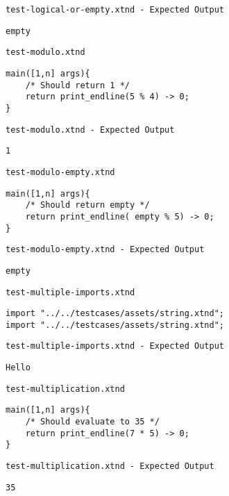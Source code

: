 \medskip \noindent \texttt{test-logical-or-empty.xtnd - Expected Output}


\begin{lstlisting}
empty
\end{lstlisting}


\medskip \noindent \texttt{test-modulo.xtnd}


\begin{lstlisting}
main([1,n] args){
	/* Should return 1 */
	return print_endline(5 % 4) -> 0;
}
\end{lstlisting}


\medskip \noindent \texttt{test-modulo.xtnd - Expected Output}


\begin{lstlisting}
1
\end{lstlisting}


\medskip \noindent \texttt{test-modulo-empty.xtnd}


\begin{lstlisting}
main([1,n] args){
	/* Should return empty */
	return print_endline( empty % 5) -> 0;
}
\end{lstlisting}


\medskip \noindent \texttt{test-modulo-empty.xtnd - Expected Output}


\begin{lstlisting}
empty
\end{lstlisting}


\medskip \noindent \texttt{test-multiple-imports.xtnd}


\begin{lstlisting}
import "../../testcases/assets/string.xtnd";
import "../../testcases/assets/string.xtnd";
\end{lstlisting}


\medskip \noindent \texttt{test-multiple-imports.xtnd - Expected Output}


\begin{lstlisting}
Hello
\end{lstlisting}


\medskip \noindent \texttt{test-multiplication.xtnd}


\begin{lstlisting}
main([1,n] args){
	/* Should evaluate to 35 */
	return print_endline(7 * 5) -> 0;
}
\end{lstlisting}


\medskip \noindent \texttt{test-multiplication.xtnd - Expected Output}


\begin{lstlisting}
35
\end{lstlisting}



